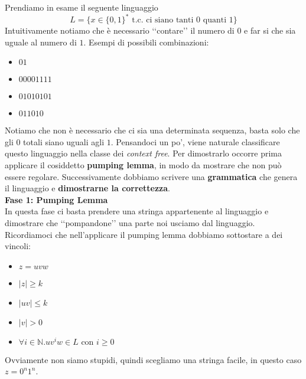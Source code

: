 \documentclass[a4paper,oneside]{scrbook}
\begin{document}
Prendiamo in esame il seguente linguaggio 
$$L=\{x\in\{0,1\}^*\text{ t.c. ci siano tanti 0 quanti 1}\}$$
Intuitivamente notiamo che è necessario ‘‘contare’’ il numero di $0$ e far si che sia uguale al numero di $1$. Esempi di possibili combinazioni:
\begin{itemize}
	\item $01$
	\item $00001111$
	\item $01010101$
	\item $011010$
\end{itemize}
Notiamo che non è necessario che ci sia una determinata sequenza, basta solo che gli $0$ totali siano uguali agli $1$.
Pensandoci un po', viene naturale classificare questo linguaggio nella classe dei \textit{context free}.
Per dimostrarlo occorre prima applicare il cosiddetto \textbf{pumping lemma}, in modo da mostrare che non può essere regolare.
Successivamente dobbiamo scrivere una \textbf{grammatica} che genera il linguaggio e \textbf{dimostrarne la correttezza}.\\
\textbf{Fase 1: Pumping Lemma}\\
In questa fase ci basta prendere una stringa appartenente al linguaggio e dimostrare che ‘‘pompandone’’ una parte noi usciamo dal linguaggio.
Ricordiamoci che nell'applicare il pumping lemma dobbiamo sottostare a dei vincoli:
\begin{itemize}
	\item $z=uvw$
	\item $|z|\geq k$
	\item $|uv|\leq k$
	\item $|v|>0$
	\item $\forall i \in \mathbb{N}.uv^iw\in L \text{ con }i\geq0$
\end{itemize}
Ovviamente non siamo stupidi, quindi scegliamo una stringa facile, in questo caso $z=0^n1^n$.
\begin{center}
\end{center}
\end{document}
